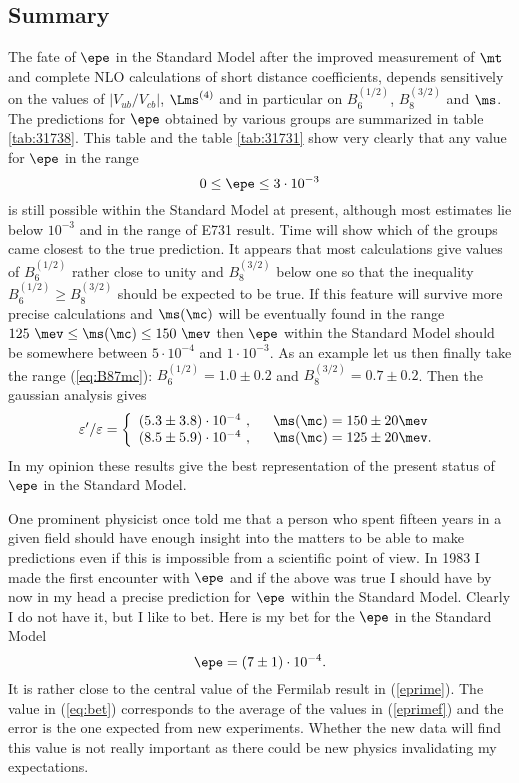 \subsection{Summary}
The fate of $\epe$ in the Standard Model after the
improved measurement of $\mt$ and complete NLO calculations of
short distance coefficients, depends sensitively on the values of
$|V_{ub}/V_{cb}|$, $\Lms^{(4)}$ and in particular on 
$B_6^{(1/2)}$, $B_8^{(3/2)}$ and $\ms$.
The predictions for $\epe$ obtained by
various groups are summarized in table \ref{tab:31738}. 
This table and the table \ref{tab:31731} show very clearly that any 
value for $\epe$ in
the range
\begin{equation}
0 \le \epe \le 3 \cdot 10^{-3}
\label{eq:epera}
\end{equation}
is still possible within the Standard Model at present, although most
estimates lie below $10^{-3}$ and in the range of E731 result.
Time will show which of the groups came closest to the true prediction.
It appears that most calculations give values of $B_6^{(1/2)}$ rather
close to unity and $B_8^{(3/2)}$ below one so that the inequality
$B_6^{(1/2)}\ge B_8^{(3/2)}$ should be expected to be true. If this
feature will survive more precise calculations and $\ms(\mc)$
will be eventually found in the range 
$125~\mev\le\ms(\mc)\le 150~\mev$ then $\epe$ within the Standard Model
should be somewhere between $5\cdot 10^{-4}$ and $1\cdot 10^{-3}$.
As an example let us then finally take the range (\ref{eq:B87mc}):
$B_6^{(1/2)}=1.0\pm 0.2$ and $B_8^{(3/2)}=0.7\pm 0.2$. Then the gaussian
analysis gives \cite{BJL96b}
\begin{equation}\label{eprimef}
\varepsilon'/\varepsilon =\left\{ \begin{array}{ll}
(5.3 \pm 3.8)\cdot 10^{-4}~, &~~\ms(\mc)=150\pm20\mev \\
(8.5 \pm 5.9)\cdot 10^{-4}~, & ~~\ms(\mc)=125\pm20\mev .\end{array} \right.
\end{equation}
In my opinion these results give the best representation of the
present status of $\epe$ in the Standard Model. 

One prominent physicist once told me that a person who spent
fifteen years in a given field should have enough insight into the
matters to be able to make predictions even if this is impossible
from a scientific point of view. In 1983 I made the first encounter
with $\epe$ and if the above was true I should have by now in my head
a precise prediction for $\epe$ within the Standard Model.
Clearly I do not have it, but I like to bet. Here is my bet for
the $\epe$ in the Standard Model
\begin{equation}
\epe= ( 7\pm 1) \cdot 10^{-4}.
\label{eq:bet}
\end{equation}
It is rather close to the central value of the Fermilab result in
(\ref{eprime}).
The value in (\ref{eq:bet}) corresponds to the average of the values in
(\ref{eprimef}) and the error is the one expected from new experiments.
Whether the new data will find this value is not really important as there
could be new physics invalidating my expectations.

